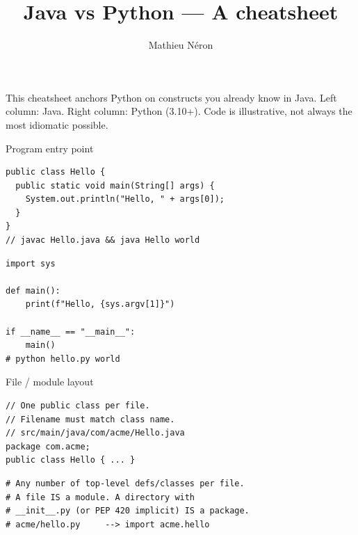 \documentclass[10pt]{article}
\title{Java vs Python --- A cheatsheet}
\author{Mathieu N\'eron}
\begin{document}

\noindent\small This cheatsheet anchors Python on constructs you already know in Java.
Left column: Java. Right column: Python (3.10+). Code is illustrative, not always
the most idiomatic possible.


\begin{construct}{Program entry point}
\noindent
\begin{minipage}[t]{0.485\linewidth}
\begin{lstlisting}[style=java, title=Java]
public class Hello {
  public static void main(String[] args) {
    System.out.println("Hello, " + args[0]);
  }
}
// javac Hello.java && java Hello world
\end{lstlisting}
\end{minipage}\hfill
\begin{minipage}[t]{0.485\linewidth}
\begin{lstlisting}[style=python, title=Python]
import sys

def main():
    print(f"Hello, {sys.argv[1]}")

if __name__ == "__main__":
    main()
# python hello.py world
\end{lstlisting}
\end{minipage}
\end{construct}

\begin{construct}{File / module layout}
\noindent
\begin{minipage}[t]{0.485\linewidth}
\begin{lstlisting}[style=java, title=Java]
// One public class per file.
// Filename must match class name.
// src/main/java/com/acme/Hello.java
package com.acme;
public class Hello { ... }
\end{lstlisting}
\end{minipage}\hfill
\begin{minipage}[t]{0.485\linewidth}
\begin{lstlisting}[style=python, title=Python]
# Any number of top-level defs/classes per file.
# A file IS a module. A directory with
# __init__.py (or PEP 420 implicit) IS a package.
# acme/hello.py     --> import acme.hello
\end{lstlisting}
\end{minipage}
\end{construct}
\end{document}
